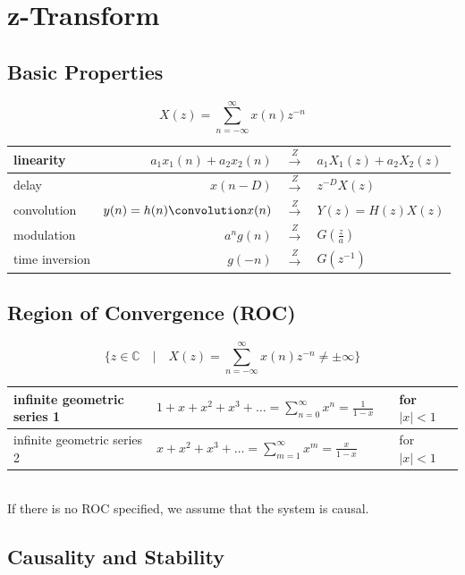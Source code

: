 \section{z-Transform}

\subsection{Basic Properties}

\[
	X(z) = \sum\limits_{n=-\infty}^\infty x(n)z^{-n}
\]

\begin{tabularx}{0.6\textwidth}{|l|r>{\centering}Xl|}
	\hline
	linearity & $a_1x_1(n) + a_2x_2(n)$ & $\overset{Z}{\longrightarrow}$ & $a_1X_1(z) + a_2X_2(z)$
	\\ \hline
	delay	& $x(n-D)$ & $\overset{Z}{\longrightarrow}$ & $z^{-D}X(z)$
	\\ \hline
	convolution & $y(n) = h(n) \convolution x(n)$ & $\overset{Z}{\longrightarrow}$ & $Y(z) = H(z)X(z)$
	\\ \hline
	modulation & $a^n g(n)$ & $\overset{Z}{\longrightarrow}$ & $G(\frac{z}{a})$
	\\ \hline
	time inversion & $g(-n)$ & $\overset{Z}{\longrightarrow}$ & $G(z^{-1})$
	\\ \hline
\end{tabularx}


\subsection{Region of Convergence (ROC)}

\[
	\{ z \in \mathbb{C} \quad | \quad X(z) = \sum\limits_{n=-\infty}^{\infty} x(n)z^{-n} \neq \pm \infty \}
\]

\label{geometricseries}
\begin{tabular}{|l|l ll|}
	\hline
	infinite geometric series 1 & $1 + x + x^2 + x^3 + \ldots = \sum\limits_{n=0}^{\infty} x^n = \frac{1}{1-x}$ &&
	for $|x| < 1$
	\\ \hline
	infinite geometric series 2 & $x + x^2 + x^3 + \ldots = \sum\limits_{m=1}^{\infty} x^m = \frac{x}{1-x}$ &&
	for $|x| < 1$
	\\ \hline
\end{tabular} \\

If there is no ROC specified, we assume that the system is causal.


\subsection{Causality and Stability}

